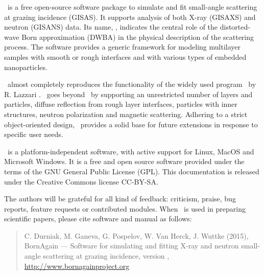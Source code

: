 

\newpage
{}


\BornAgain\ is a free open-source software package to simulate and fit small-angle
scattering at grazing incidence (GISAS). 
It supports analysis of both  X-ray (GISAXS) and neutron (GISANS) data.
Its name, \BornAgain, indicates the central role of the distorted-wave Born
approximation (DWBA) in the physical description of the
scattering process. The software provides a generic framework for modeling multilayer samples with smooth or
rough interfaces and with various types of embedded nano\-particles.

\BornAgain\ almost completely reproduces the functionality
of the widely used program \IsGISAXS\
by R. Lazzari \cite{Laz02}.
\BornAgain\ goes beyond \IsGISAXS\ by
supporting an unrestricted number of layers and particles, 
diffuse reflection from rough layer interfaces,
particles with inner structures, neutron polarization and magnetic scattering.
Adhering to a strict object-oriented design,
\BornAgain\ provides a solid base for future extensions
in response to specific user needs.

\BornAgain\ is a platform-independent software,
with active support for Linux, MacOS and 
Microsoft Windows. 
It is a free and open source software provided under the terms
of the GNU General Public License (GPL).
This documentation is released under the Creative Commons license CC-BY-SA.

The authors will be grateful for all kind of
feedback: criticism, praise, bug reports, feature requests
or contributed modules.
When \BornAgain\ is used in preparing scientific papers,
please cite software and manual as follows: 
\begin{quote}
C. Durniak, M. Ganeva, G. Pospelov, W. Van Herck, J. Wuttke (2015),\newline
BornAgain --- Software for simulating and fitting
X-ray and neutron small-angle scattering at grazing incidence,
version \UserManualVersionNumber,\newline
\url{http://www.bornagainproject.org}
\end{quote}

